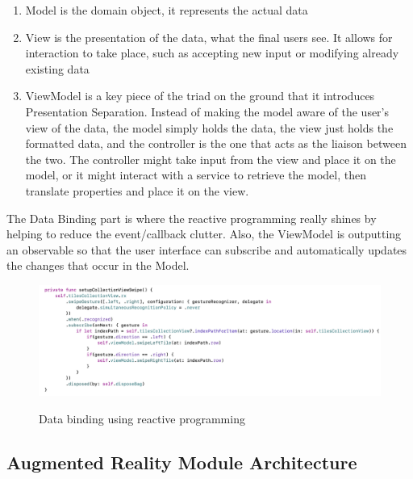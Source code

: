 \documentclass[12 pct]{report}
\begin{document}
\begin{enumerate}
\item Model is the domain object, it represents the actual data 
\item View is the presentation of the data, what the final users see. It allows for interaction to take place, such as accepting new input or  modifying already existing data
\item ViewModel is a key piece of the triad on the ground that it introduces Presentation Separation.  Instead of making the model aware of the user’s view of the data, the model simply holds the data, the view just holds the formatted data, and the controller is the one that acts as the liaison between the two. The controller might take input from the view and place it on the model, or it might interact with a service to retrieve the model, then translate properties and place it on the view.
\end{enumerate}

The Data Binding part is where the reactive programming really shines by helping to reduce the event/callback clutter. Also, the ViewModel is outputting an observable so that the user interface can subscribe and automatically updates the changes that occur in the Model.


\begin{figure}[H]
\includegraphics[width=1.0\textwidth]{reactive-ui}
\centering
\label{fig:reactive-repository}
\caption{Data binding using reactive programming}
\end{figure}

\subsection*{Augmented Reality Module Architecture}
\end{document}
